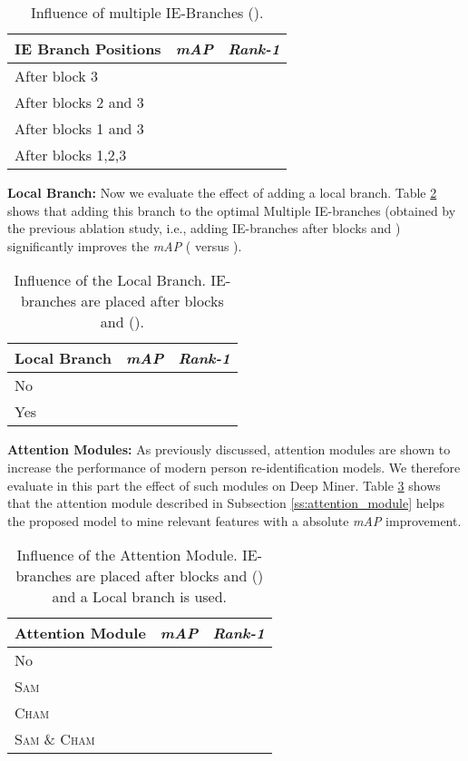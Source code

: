 \documentclass[final]{cvpr}
\begin{document}
\begin{table}[h!]
\centering
\footnotesize
\begin{tabular}{@{}lll@{}}
\toprule
IE Branch Positions   & \textit{mAP} & \textit{Rank-1}  \\ \midrule
After block 3           &   & \\
After blocks 2 and 3   &   & \\
After blocks 1 and 3   &  &   \\
After blocks 1,2,3      &  &  \\ \bottomrule
\end{tabular}
\caption{Influence of multiple IE-Branches ().}
\label{tab:multiple_ie_branches}
\end{table}

\textbf{Local Branch:} Now we evaluate the effect of adding a local branch. Table \ref{tab:local_branch} shows that adding this branch to the optimal Multiple IE-branches (obtained by the previous ablation study, i.e., adding IE-branches after blocks  and ) significantly improves the \textit{mAP} ( versus ).

\begin{table}[h!]
\centering
\footnotesize
\begin{tabular}{@{}lll@{}}
\toprule
Local Branch  & \textit{mAP} & \textit{Rank-1} \\ \midrule
No              &  &  \\
Yes            &  & \\ \bottomrule



\end{tabular}
\caption{Influence of the Local Branch.  IE-branches are placed after blocks  and  ().}
\label{tab:local_branch}
\end{table}

\textbf{Attention Modules:} As previously discussed, attention modules are shown to increase the performance of modern person re-identification models. We therefore evaluate in this part the effect of such modules on Deep Miner. Table \ref{tab:attention_module} shows that the attention module described in Subsection \ref{ss:attention_module} helps the proposed model to mine relevant features with a  absolute \textit{mAP} improvement. 

\begin{table}[h!]
\centering
\footnotesize
\begin{tabular}{@{}lll@{}}
\toprule
Attention Module  & \textit{mAP}  & \textit{Rank-1} \\ \midrule
No                 &  &  \\
\textsc{Sam}                 &  &  \\
\textsc{Cham}                 &  &  \\
\textsc{Sam} \& \textsc{Cham}            &   &  \\ \bottomrule
\end{tabular}
\caption{Influence of the Attention Module. IE-branches are placed after blocks  and  () and a Local branch is used.}
\label{tab:attention_module}
\end{table}
\end{document}
